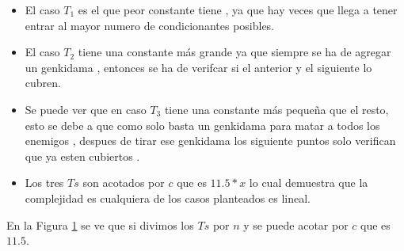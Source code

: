 	     \begin{itemize} 
            \item El caso $T_1$ es el que peor constante tiene , ya que hay veces que llega a tener entrar al mayor numero de condicionantes posibles.
            \item 	El caso $T_2$ tiene una constante más grande ya que siempre se ha de agregar un genkidama , entonces se ha de verifcar si el anterior y el siguiente lo cubren.  
             \item Se puede ver que en caso $T_3$ tiene una constante más pequeña que el resto, esto se debe a que como solo basta un genkidama para matar a todos los enemigos , despues de tirar ese genkidama los siguiente puntos solo verifican que ya esten cubiertos .
            \item Los tres $Ts$ son acotados por $c$ que es $11.5 * x$ lo cual demuestra que la complejidad es cualquiera de los casos planteados es lineal. 
        \end{itemize}


	

	
	\begin{figure}[H]
		\centering
		\caption{}
		\label{fig:exp2:part_tiempo_sobre_n}
	\end{figure}

	En la Figura \ref{fig:exp2:part_tiempo_sobre_n} se ve que si divimos los $Ts$ por $n$ y se puede acotar por $c$ que es $11.5$.


